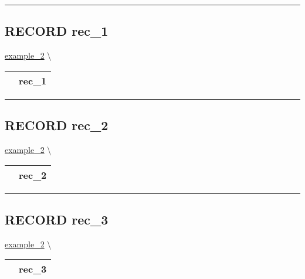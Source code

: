 \rule{\linewidth}{0.5pt}

\subsection*{\textsf{\colorbox{headtoc}{\color{white} RECORD}
rec\_1}}

\hypertarget{ecldoc:intest.inintest.example_2.rec_1}{}
\hspace{0pt} \hyperlink{ecldoc:intest.inintest.example_2}{example_2} \textbackslash 

{\renewcommand{\arraystretch}{1.5}
\begin{tabularx}{\textwidth}{|>{\raggedright\arraybackslash}l|X|}
\hline
\hspace{0pt}\mytexttt{\color{red} } & \textbf{rec\_1} \\
\hline
\end{tabularx}
}

\par


\rule{\linewidth}{0.5pt}
\subsection*{\textsf{\colorbox{headtoc}{\color{white} RECORD}
rec\_2}}

\hypertarget{ecldoc:intest.inintest.example_2.rec_2}{}
\hspace{0pt} \hyperlink{ecldoc:intest.inintest.example_2}{example_2} \textbackslash 

{\renewcommand{\arraystretch}{1.5}
\begin{tabularx}{\textwidth}{|>{\raggedright\arraybackslash}l|X|}
\hline
\hspace{0pt}\mytexttt{\color{red} } & \textbf{rec\_2} \\
\hline
\end{tabularx}
}

\par


\rule{\linewidth}{0.5pt}
\subsection*{\textsf{\colorbox{headtoc}{\color{white} RECORD}
rec\_3}}

\hypertarget{ecldoc:intest.inintest.example_2.rec_3}{}
\hspace{0pt} \hyperlink{ecldoc:intest.inintest.example_2}{example_2} \textbackslash 

{\renewcommand{\arraystretch}{1.5}
\begin{tabularx}{\textwidth}{|>{\raggedright\arraybackslash}l|X|}
\hline
\hspace{0pt}\mytexttt{\color{red} } & \textbf{rec\_3} \\
\hline
\end{tabularx}
}

